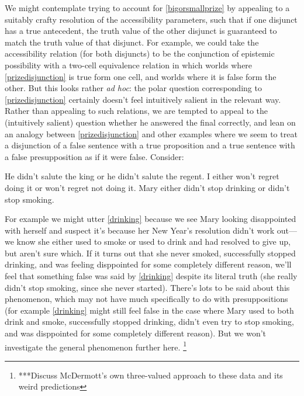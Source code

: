 \documentclass[If.tex]{subfiles}
\begin{document}
We might contemplate trying to account for \ref{bigorsmallprize} by appealing to a suitably crafty resolution of the accessibility parameters, such that if one disjunct has a true antecedent, the truth value of the other disjunct is guaranteed to match the truth value of that disjunct.  For example, we could take the accessibility relation (for both disjuncts) to be the conjunction of epistemic possibility with a two-cell equivalence relation in which worlds where \ref{prizedisjunction} is true form one cell, and worlds where it is false form the other.  But this looks rather \emph{ad hoc}: the polar question corresponding to \ref{prizedisjunction} certainly doesn't feel intuitively salient in the relevant way.  Rather than appealing to such relations, we are tempted to appeal to the (intuitively salient) question whether he answered the final correctly, and lean on an analogy between \ref{prizedisjunction} and other examples where we seem to treat a disjunction of a false sentence with a true proposition and a true sentence with a false presupposition as if it were false.  Consider:
\begin{prop}
	\nitem
	\begin{prop}
		\aitem
		He didn't salute the king or he didn't salute the regent.
		\aitem
		I either won't regret doing it or won't regret not doing it.  
		\aitem \label{drinking}
		Mary either didn't stop drinking or didn't stop smoking.  
	\end{prop}
\end{prop}
For example we might utter \ref{drinking} because we see Mary looking disappointed with herself and suspect it's because her New Year's resolution didn't work out---we know she either used to smoke or used to drink and had resolved to give up, but aren't sure which.  If it turns out that she never smoked, successfully stopped drinking, and was feeling disppointed for some completely different reason, we'll feel that something false was said by \ref{drinking} despite its literal truth (she really didn't stop smoking, since she never started).  There's lots to be said about this phenomenon, which may not have much specifically to do with presuppositions (for example \ref{drinking} might still feel false in the case where Mary used to both drink and smoke, successfully stopped drinking, didn't even try to stop smoking, and was disppointed for some completely different reason).  But we won't investigate the general phenomenon further here.%
\footnote{***Discuss McDermott's own three-valued approach to these data and its weird predictions}
\end{document}
